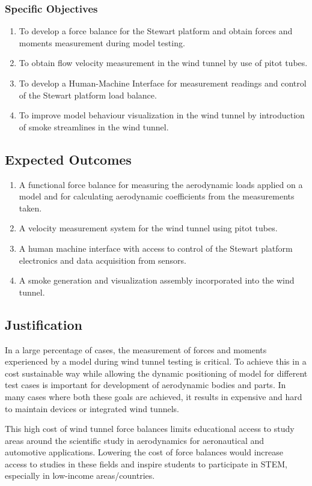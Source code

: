 \subsubsection{Specific Objectives}
\begin{enumerate}
    \item To develop a force balance for the Stewart platform and obtain forces and moments measurement during model testing.
    \item To obtain flow velocity measurement in the wind tunnel by use of pitot tubes.
    \item To develop a Human-Machine Interface for measurement readings and control of the Stewart platform load balance.
    \item To improve model behaviour visualization in the wind tunnel by introduction of smoke streamlines in the wind tunnel.
\end{enumerate}
\subsection{Expected Outcomes}
\begin{enumerate}
    \item A functional force balance for measuring the aerodynamic loads applied on a model
          and for calculating aerodynamic coefficients from the measurements taken.
    \item A velocity measurement system for the wind tunnel using pitot tubes.
    \item A human machine interface with access to control of the Stewart platform electronics
          and data acquisition from sensors.
    \item A smoke generation and visualization assembly incorporated into the wind tunnel.
\end{enumerate}

\subsection{Justification}
In a large percentage of cases, the measurement of forces and moments experienced by
a model during wind tunnel testing is critical. To achieve this in a cost sustainable way
while allowing the dynamic positioning of model for different test cases is important for
development of aerodynamic bodies and parts. In many cases where both these goals are
achieved, it results in expensive and hard to maintain devices or integrated wind tunnels.

This high cost of wind tunnel force balances limits educational access to study areas around
 the scientific study in aerodynamics for aeronautical and automotive applications. Lowering 
the cost of force balances would increase access to studies in these fields and inspire
 students to participate in STEM, especially in low-income areas/countries.